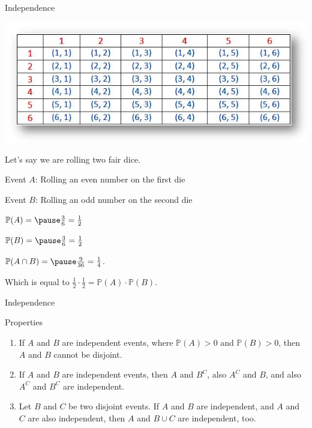 \documentclass{beamer}
\newcommand{\PP}{\mathbb{P}}
\begin{document}
\begin{frame}{Independence}
\begin{center}
\includegraphics[scale=0.4]{xprobability-for-rolling-two-dice.jpg.pagespeed.ic.MTXD4wiqQ_.jpg}
    
\end{center}
\begin{example}
Let's say we are rolling two fair dice.\pause

Event \(A\): Rolling an even number on the first die

Event \(B\): Rolling an odd number on the second die

\(\PP(A) = \pause\frac{3}{6} = \frac{1}{2}\)

\(\PP(B) = \pause\frac{3}{6} = \frac{1}{2}\) 

\(\PP(A \cap B) = \pause\frac{9}{36}=\frac{1}{4}\).

Which is equal to $\frac{1}{2}\cdot \frac{1}{2} = \PP(A)\cdot \PP(B)$.

\end{example}

\end{frame}



\begin{frame}{Independence}
    \begin{block}{Properties}
        \begin{enumerate}[<+->]
            \item If \(A\) and \(B\) are independent events, where \(\PP(A) > 0\) and \(\PP(B) > 0\), then \(A\) and \(B\) cannot be disjoint.

            \item If \(A\) and \(B\) are independent events, then \(A\) and \(B^C\), also \(A^C\) and \(B\), and also \(A^C\) and \(B^C\) are independent.

\item Let \(B\) and \(C\) be two disjoint events. If \(A\) and \(B\) are independent, and \(A\) and \(C\) are also independent, then \(A\) and \(B \cup C\) are independent, too.

        \end{enumerate}
    \end{block}
    
\end{frame}
\end{document}
